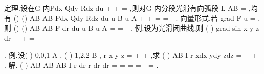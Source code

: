 \textcolor{lyred}{定理}.设在G 内Pdx
Qdy
Rdz
du
+
+
=
,则对G 内分段光滑有向弧段
\approx 
L
AB
=
,均有 
\approx 
\approx 
()
()
AB
AB
Pdx
Qdy
Rdz
du
u B
u A
+
+
=
=
-
\int 
\int 
. 
\textcolor{lyred}{向量形式}.若
grad
F
u
=
\rho 
,则
\approx 
\approx 
()
()
AB
AB
F dr
du
u B
u A
\cdots 
=
=
-
\int 
\int 
\rho 
\rho 
. 
\textcolor{lyred}{例}.设\Gamma 为光滑闭曲线,则
(
)
grad sin
x
y
z
dr
\Gamma 
+
+
\cdots 
=




\int 
\rho 
\nabla 
. 
\textcolor{lyred}{例}.设(
)
0,0,1
A
,
(
)
1,2,2
B
,
r
x
y
z
=
+
+
,求
(
)
\approx 
AB
I
r
xdx
ydy
zdz
=
+
+
\int 
. 
解.
\approx 
\approx 
\approx 
(
)
AB
AB
AB
I
r dr
r dr
dr
=
=
=
=
-
=
\int 
\int 
\int 
. 